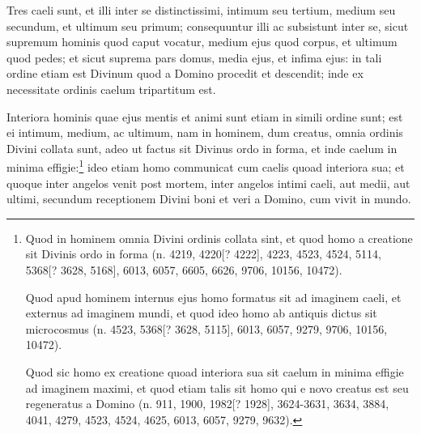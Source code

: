 
\begin{topic}{29}
    Tres caeli sunt, et illi inter se distinctissimi, intimum seu tertium, medium seu secundum, et ultimum seu primum;
    consequuntur illi ac subsistunt inter se, sicut supremum hominis quod caput vocatur, medium ejus quod corpus, et
    ultimum quod pedes; et sicut suprema pars domus, media ejus, et infima ejus: in tali ordine etiam est Divinum quod a
    Domino procedit et descendit; inde ex necessitate ordinis caelum tripartitum est.
\end{topic}

\begin{topic}{30}
    Interiora hominis quae ejus mentis et animi sunt etiam in simili ordine sunt; est ei intimum, medium, ac ultimum,
    nam in hominem, dum creatus, omnia ordinis Divini collata sunt, adeo ut factus sit Divinus ordo in forma, et inde
    caelum in minima effigie:\footnote{Quod in hominem omnia Divini ordinis collata sint, et quod homo a creatione sit
    Divinis ordo in forma (n. 4219, 4220[? 4222], 4223, 4523, 4524, 5114, 5368[? 3628, 5168], 6013, 6057, 6605, 6626,
    9706, 10156, 10472).

    Quod apud hominem internus ejus homo formatus sit ad imaginem caeli, et externus ad imaginem mundi, et quod ideo
    homo ab antiquis dictus sit microcosmus (n. 4523, 5368[? 3628, 5115], 6013, 6057, 9279, 9706, 10156, 10472).

    Quod sic homo ex creatione quoad interiora sua sit caelum in minima effigie ad imaginem maximi, et quod etiam talis
    sit homo qui e novo creatus est seu regeneratus a Domino (n. 911, 1900, 1982[? 1928], 3624-3631, 3634, 3884, 4041,
    4279, 4523, 4524, 4625, 6013, 6057, 9279, 9632).} ideo etiam homo communicat cum caelis quoad interiora sua; et
    quoque inter angelos venit post mortem, inter angelos intimi caeli, aut medii, aut ultimi, secundum receptionem
    Divini boni et veri a Domino, cum vivit in mundo.
\end{topic}

